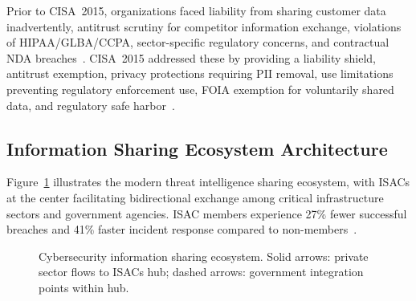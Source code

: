 \documentclass[journal]{IEEEtran}
\begin{document}
Prior to CISA~2015, organizations faced liability from sharing customer data inadvertently, antitrust scrutiny for competitor information exchange, violations of HIPAA/GLBA/CCPA, sector-specific regulatory concerns, and contractual NDA breaches~\cite{solove2024privacy,bambauer2024antitrust}. CISA~2015 addressed these by providing a liability shield, antitrust exemption, privacy protections requiring PII removal, use limitations preventing regulatory enforcement use, FOIA exemption for voluntarily shared data, and regulatory safe harbor~\cite{congress2015cisa}.

\subsection{Information Sharing Ecosystem Architecture}

Figure~\ref{fig:ecosystem} illustrates the modern threat intelligence sharing ecosystem, with ISACs at the center facilitating bidirectional exchange among critical infrastructure sectors and government agencies. ISAC members experience 27\% fewer successful breaches and 41\% faster incident response compared to non-members~\cite{gartner2024isac}.

\begin{figure}[!t]
\centering
{}
\caption{Cybersecurity information sharing ecosystem. Solid arrows: private sector flows to ISACs hub; dashed arrows: government integration points within hub.}
\label{fig:ecosystem}
\end{figure}
\end{document}
